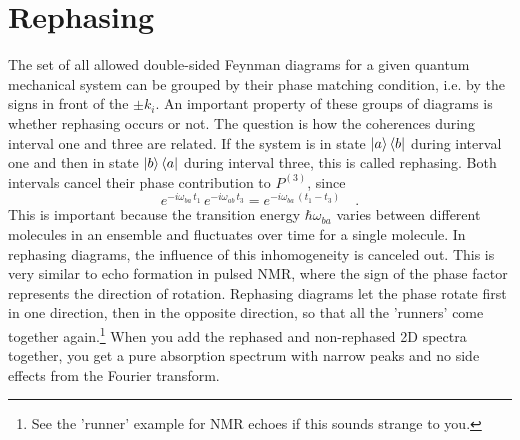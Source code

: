 \section{Rephasing}

The set of all allowed double-sided Feynman diagrams for a given quantum mechanical system can be grouped by their phase matching condition, i.e. by the signs in front of the $\pm k_i$. An important property of these groups of diagrams is whether rephasing occurs or not. The question is how the coherences during interval one and three are related. If the system is in state $\ket{a}\bra{b}$ during interval one and then in state $\ket{b}\bra{a}$ during interval three, this is called rephasing. Both intervals cancel their phase contribution to $P^{(3)}$, since
\begin{equation}
  e^{- i \omega_{ba} \, t_1} \,   e^{- i \omega_{ab} \, t_3} =   e^{- i  \omega_{ba} \, ( t_1 - t_3)} \quad .
\end{equation}
This is important because the transition energy $\hbar \omega_{ba}$ varies between different molecules in an ensemble and fluctuates over time for a single molecule. In rephasing diagrams, the influence of this inhomogeneity is canceled out. This is very similar to echo formation in pulsed NMR, where the sign of the phase factor represents the direction of rotation. Rephasing diagrams let the phase rotate first in one direction, then in the opposite direction, so that all the 'runners' come together again.\footnote{See the 'runner' example for NMR echoes if this sounds strange to you.} When you add the rephased and non-rephased 2D spectra together, you get a pure absorption spectrum with narrow peaks and no side effects from the Fourier transform.



\printbibliography[segment=\therefsegment,heading=subbibliography]
